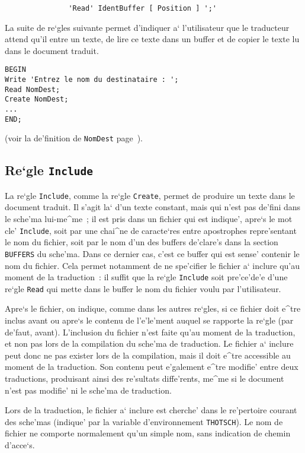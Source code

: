 {\begin{verbatim}
               'Read' IdentBuffer [ Position ] ';'
\end{verbatim}

\begin{example}
La suite de re`gles suivante permet d'indiquer a` l'utilisateur que le
traducteur attend qu'il entre un texte, de lire ce texte dans un buffer et
de copier le texte lu dans le document traduit.
\begin{verbatim}
BEGIN
Write 'Entrez le nom du destinataire : ';
Read NomDest;
Create NomDest;
...
END;
\end{verbatim}
(voir la de'finition de {\tt NomDest} page~\pageref{nomdest}).
\end{example}

\subsection{Re`gle {\tt Include}}

La re`gle {\tt Include}, comme la re`gle {\tt Create}, permet de produire
un texte dans le document traduit. Il s'agit la` d'un texte constant, mais
qui n'est pas de'fini dans le sche'ma lui-me^me~; il est pris dans un fichier
qui est indique', apre`s le mot cle' {\tt Include}, soit par une chai^ne
de caracte`res entre apostrophes repre'sentant le nom du fichier, soit
par le nom d'un des buffers de'clare's dans la section {\tt BUFFERS} du
sche'ma. Dans ce dernier cas, c'est ce buffer qui est sense' contenir
le nom du fichier. Cela permet notamment de ne spe'cifier le fichier a`
inclure qu'au moment de la traduction~: il suffit que la re`gle {\tt Include}
soit pre'ce'de'e d'une re`gle {\tt Read} qui mette dans le buffer le nom
du fichier voulu par l'utilisateur.

Apre`s le fichier, on indique, comme
dans les autres re`gles, si ce fichier doit e^tre inclus avant ou apre`s
le contenu de l'e'le'ment auquel se rapporte la re`gle (par de'faut, avant).
L'inclusion du fichier n'est faite qu'au moment de la traduction, et non pas
lors de la compilation du sche'ma de traduction. Le fichier a` inclure peut
donc ne pas exister lors de la compilation, mais il doit e^tre accessible
au moment de la traduction. Son contenu peut e'galement e^tre modifie' entre
deux traductions, produisant ainsi des re'sultats diffe'rents, me^me si le
document n'est pas modifie' ni le sche'ma de traduction.

Lors de la traduction, le fichier a` inclure est cherche' dans le re'pertoire
courant des sche'mas (indique' par la variable d'environnement {\tt THOTSCH}).
Le nom de fichier
ne comporte normalement qu'un simple nom, sans indication de chemin d'acce`s.

}
